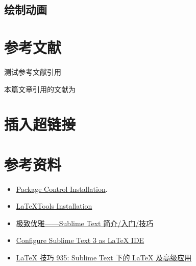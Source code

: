 \documentclass[cn, math=cm]{elegantbook}
\begin{document}
	\subsection{绘制动画}
		
	\section{参考文献}
	测试参考文献引用

	本篇文章引用的文献为\cite{kearon1998noninvasive}
	\printbibliography[heading=bibintoc, title=参考文献]

	\section{插入超链接}
	\section*{参考资料}
	\begin{itemize}
	  \item \href{https://packagecontrol.io/installation}{Package Control Installation}.
	  \item \href{https://latextools.readthedocs.io/en/latest/install/}{LaTeXTools Installation}
	  \item \href{https://liam.page/2013/11/11/Sublime-elegant/}{极致优雅——Sublime Text 简介/入门/技巧}
	  \item \href{https://ddswhu.me/posts/2018-06/sublime-text-for-latex/}{Configure Sublime Text 3 as LaTeX IDE}
	  \item \href{http://www.latexstudio.net/archives/51449.html}{LaTeX 技巧 935: Sublime Text 下的 LaTeX 及高级应用}
	\end{itemize}
\end{document}
